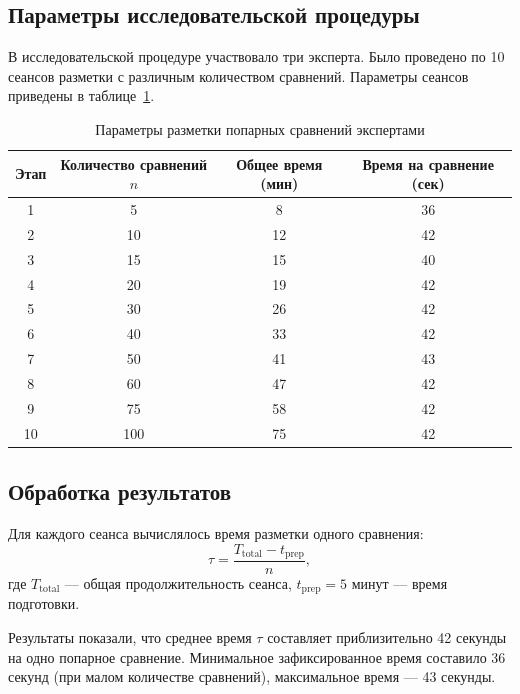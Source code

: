 \subsection*{Параметры исследовательской процедуры}

В исследовательской процедуре участвовало три эксперта.
Было проведено по 10 сеансов разметки с различным количеством сравнений.
Параметры сеансов приведены в таблице~\ref{tab:sessions}.

\begin{landscape}
\vspace*{\fill}
\begin{table}[H]
\centering
\caption{Параметры разметки попарных сравнений экспертами}
\label{tab:sessions}
\begin{tabular}{|c|c|c|c|}
\hline
\textbf{Этап} & \textbf{Количество сравнений \(n\)} & \textbf{Общее время (мин)} & \textbf{Время на сравнение (сек)} \\
\hline
1 & 5 & 8 & 36 \\
\hline
2 & 10 & 12 & 42 \\
\hline
3 & 15 & 15 & 40 \\
\hline
4 & 20 & 19 & 42 \\
\hline
5 & 30 & 26 & 42 \\
\hline
6 & 40 & 33 & 42 \\
\hline
7 & 50 & 41 & 43 \\
\hline
8 & 60 & 47 & 42 \\
\hline
9 & 75 & 58 & 42 \\
\hline
10 & 100 & 75 & 42 \\
\hline
\end{tabular}
\end{table}
\vspace*{\fill}
\end{landscape}

\subsection*{Обработка результатов}

Для каждого сеанса вычислялось время разметки одного сравнения:
\begin{equation}
    \tau = \frac{T_{\text{total}} - t_{\text{prep}}}{n},
    \label{obrabotkaresultatov}
\end{equation}
где \(T_{\text{total}}\) --- общая продолжительность сеанса, \(t_{\text{prep}} = 5\) минут --- время подготовки.

Результаты показали, что среднее время \(\tau\) составляет приблизительно 42 секунды на одно попарное сравнение. 
Минимальное зафиксированное время составило 36 секунд (при малом количестве сравнений), максимальное время --- 43 секунды.

